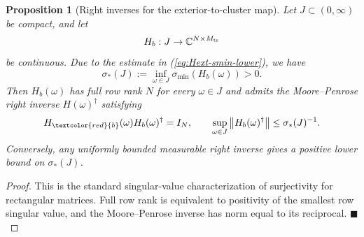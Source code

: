 \documentclass[11pt,a4paper]{article}
\numberwithin{equation}{section}
\newtheorem{proposition}[theorem]{Proposition}
\newcommand{\C}{\mathbb{C}}
\newcommand{\norm}[1]{\left\lVert #1 \right\rVert}
\begin{document}
\begin{proposition}[Right inverses for the exterior-to-cluster map]
\label{prop:right-inverse-band}
Let $J\subset (0,\infty)$ be compact, and let
\[
  H_{b}:J\to \C^{N\times M_{\rm tr}}
\]
be continuous. Due to the estimate in (\ref{eq:Hext-smin-lower}), we have
\begin{equation}
\label{eq:sigma-min-lower}
 \sigma_*(J):=\inf_{\omega\in J}\sigma_{\min}(H_{b}(\omega))>0.
\end{equation}
Then $H_{b}(\omega)$ has full row rank $N$ for every $\omega\in J$ and admits the Moore--Penrose right inverse $H(\omega)^\dagger$ satisfying
\[
   H_{\textcolor{red}{b}}(\omega)H_{b}(\omega)^\dagger=I_N,
   \qquad
   \sup_{\omega\in J}
   \norm{H_{b}(\omega)^\dagger}
   \le \sigma_*(J)^{-1}.
\]
Conversely, any uniformly bounded measurable right inverse gives a positive lower bound on $\sigma_*(J)$.
\end{proposition}

\begin{proof}
This is the standard singular-value characterization of surjectivity for rectangular matrices. Full row rank is equivalent to positivity of the smallest row singular value, and the Moore--Penrose inverse has norm equal to its reciprocal. \hfill $\blacksquare$
\end{proof}
\end{document}
